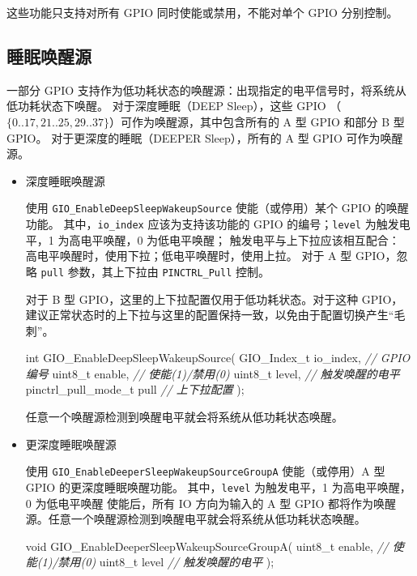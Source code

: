 \documentclass[
  12pt,
]{book}
\makeatletter
\newenvironment{Shaded}{\begin{snugshade}}{\end{snugshade}}
\newcommand{\CommentTok}[1]{\textcolor[rgb]{0.56,0.35,0.01}{\textit{#1}}}
\newcommand{\DataTypeTok}[1]{\textcolor[rgb]{0.13,0.29,0.53}{#1}}
\newcommand{\NormalTok}[1]{#1}
\newenvironment{kframe}{%
\medskip{}
\setlength{\fboxsep}{.8em}
 \def\at@end@of@kframe{}%
 \ifinner\ifhmode%
  \def\at@end@of@kframe{\end{minipage}}%
  \begin{minipage}{\columnwidth}%
 \fi\fi%
 \def\FrameCommand##1{\hskip\@totalleftmargin \hskip-\fboxsep
 \colorbox{shadecolor}{##1}\hskip-\fboxsep
     \hskip-\linewidth \hskip-\@totalleftmargin \hskip\columnwidth}%
 \MakeFramed {\advance\hsize-\width
   \@totalleftmargin\z@ \linewidth\hsize
   \@setminipage}}%
 {\par\unskip\endMakeFramed%
 \at@end@of@kframe}
\newenvironment{rmdblock}[1]
  {
  \begin{itemize}
  \renewcommand{\labelitemi}{
    \raisebox{-.7\height}[0pt][0pt]{
      {\setkeys{Gin}{width=3em,keepaspectratio}\texttt{[image: images/\#1]}}
    }
  }
  \setlength{\fboxsep}{1em}
  \begin{kframe}
  \item
  }
  {
  \end{kframe}
  \end{itemize}
  }
\newenvironment{rmdnote}
  {\begin{rmdblock}{note}}
  {\end{rmdblock}}
\makeatother
\begin{document}
\begin{rmdnote}
这些功能只支持对所有 GPIO 同时使能或禁用，不能对单个 GPIO 分别控制。
\end{rmdnote}

\hypertarget{ux7761ux7720ux5524ux9192ux6e90}{%
\subsection{睡眠唤醒源}\label{ux7761ux7720ux5524ux9192ux6e90}}

一部分 GPIO 支持作为低功耗状态的唤醒源：出现指定的电平信号时，将系统从低功耗状态下唤醒。
对于深度睡眠（DEEP Sleep），这些 GPIO （\(\{0..17, 21..25, 29..37\}\)）可作为唤醒源，其中包含所有的 A 型 GPIO 和部分 B 型 GPIO。
对于更深度的睡眠（DEEPER Sleep），所有的 A 型 GPIO 可作为唤醒源。

\begin{itemize}
\item
  深度睡眠唤醒源

  使用 \texttt{GIO\_EnableDeepSleepWakeupSource} 使能（或停用）某个 GPIO 的唤醒功能。
  其中，\texttt{io\_index} 应该为支持该功能的 GPIO 的编号；\texttt{level} 为触发电平，1 为高电平唤醒，0 为低电平唤醒；
  触发电平与上下拉应该相互配合：
  高电平唤醒时，使用下拉；低电平唤醒时，使用上拉。
  对于 A 型 GPIO，忽略 \texttt{pull} 参数，其上下拉由 \texttt{PINCTRL\_Pull} 控制。

  对于 B 型 GPIO，这里的上下拉配置仅用于低功耗状态。对于这种 GPIO，
  建议正常状态时的上下拉与这里的配置保持一致，以免由于配置切换产生``毛刺''。

\begin{Shaded}
\begin{Highlighting}[]
\DataTypeTok{int}\NormalTok{ GIO_EnableDeepSleepWakeupSource(}
\NormalTok{  GIO_Index_t io_index,     }\CommentTok{// GPIO 编号}
  \DataTypeTok{uint8_t}\NormalTok{ enable,           }\CommentTok{// 使能(1)/禁用(0)}
  \DataTypeTok{uint8_t}\NormalTok{ level,            }\CommentTok{// 触发唤醒的电平}
\NormalTok{  pinctrl_pull_mode_t pull  }\CommentTok{// 上下拉配置}
\NormalTok{);}
\end{Highlighting}
\end{Shaded}

  任意一个唤醒源检测到唤醒电平就会将系统从低功耗状态唤醒。
\item
  更深度睡眠唤醒源

  使用 \texttt{GIO\_EnableDeeperSleepWakeupSourceGroupA} 使能（或停用）A 型 GPIO 的更深度睡眠唤醒功能。
  其中，\texttt{level} 为触发电平，1 为高电平唤醒，0 为低电平唤醒
  使能后，所有 IO 方向为输入的 A 型 GPIO 都将作为唤醒源。任意一个唤醒源检测到唤醒电平就会将系统从低功耗状态唤醒。

\begin{Shaded}
\begin{Highlighting}[]
\DataTypeTok{void}\NormalTok{ GIO_EnableDeeperSleepWakeupSourceGroupA(}
  \DataTypeTok{uint8_t}\NormalTok{ enable,           }\CommentTok{// 使能(1)/禁用(0)}
  \DataTypeTok{uint8_t}\NormalTok{ level             }\CommentTok{// 触发唤醒的电平}
\NormalTok{);}
\end{Highlighting}
\end{Shaded}
\end{itemize}
\end{document}

